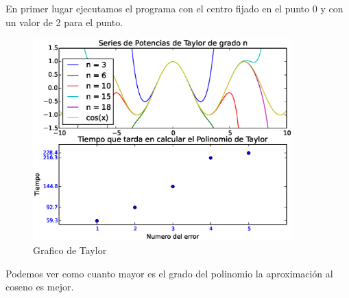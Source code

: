 En primer lugar ejecutamos el programa con el centro fijado en el punto 0 y con un valor de 2 para el punto.
\begin{figure}[htb]
\begin{center}
\includegraphics[width=10cm]{Graficas.eps}
\caption{Grafico de Taylor}
\label{fig}
\end{center}
\end{figure}

Podemos ver como cuanto mayor es el grado del polinomio la aproximaci\'on al coseno es mejor.\\ 

